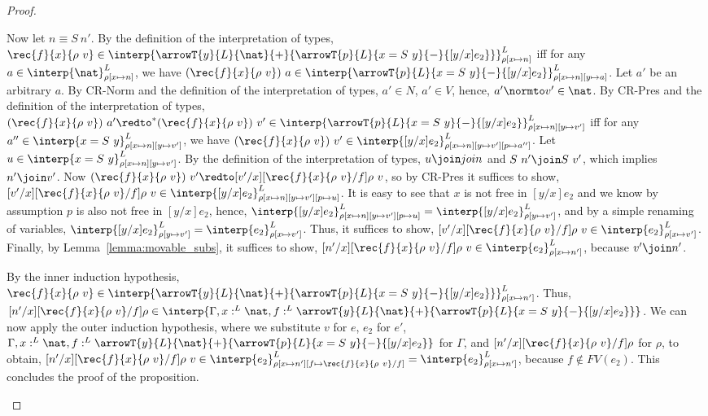 \begin{proof}
\begin{itemize}
  \noindent
  Now let $n \equiv S\ n'$.  By the definition of the interpretation
  of types, $\rec{f}{x}{\rho\ v} \in
  \interp{\arrowT{y}{L}{\nat}{+}{\arrowT{p}{L}{x =
  S\ y}{-}{[y/x]e_2}}}^L_{\rho[x \mapsto n]}$ iff for any $a
  \in \interp{\nat}^L_{\rho[x \mapsto n]}$, we have
  $(\rec{f}{x}{\rho\ v})\ a \in \interp{\arrowT{p}{L}{x =
  S\ y}{-}{[y/x]e_2}}^L_{\rho[x \mapsto n][y \mapsto a]}$.  Let
  $a'$ be an arbitrary $a$. By CR-Norm and the definition of the
  interpretation of types, $a' \in N$, $a' \in V$, hence, $a' \normto
  v' \in \nat$.  By CR-Pres and the definition of the interpretation of
  types, $(\rec{f}{x}{\rho\ v})\ a' \redto^*
  (\rec{f}{x}{\rho\ v})\ v' \in \interp{\arrowT{p}{L}{x =
  S\ y}{-}{[y/x]e_2}}^L_{\rho[x \mapsto n][y \mapsto v']}$ iff
  for any $a'' \in \interp{x = S\ y}^L_{\rho[x \mapsto n][y \mapsto
  v']}$, we have $(\rec{f}{x}{\rho\ v})\ v' \in
  \interp{[y/x]e_2}^L_{\rho[x \mapsto n][y \mapsto v'][p \mapsto 
  a'']}$.  Let 
  $u \in \interp{x = S\ y}^L_{\rho[x \mapsto n][y \mapsto v']}$.  By the definition of the
  interpretation of types, $u \join join$ and $S\ n' \join S\ v'$,
  which implies $n' \join v'$.  Now $(\rec{f}{x}{\rho\ v})\ v'
  \redto [v'/x][\rec{f}{x}{\rho\ v}/f]\rho\ v$, so by CR-Pres it
  suffices to show, $[v'/x][\rec{f}{x}{\rho\ v}/f]\rho\ v \in
  \interp{[y/x]e_2}^L_{\rho[x \mapsto n][y \mapsto v'][p \mapsto
  u]}$.  It is easy to see that $x$ is not free in $[y/x]e_2$ and
  we know by assumption $p$ is also not free in $[y/x]e_2$, hence, 
  $\interp{[y/x]e_2}^L_{\rho[x \mapsto n][y \mapsto v'][p \mapsto u]} = 
  \interp{[y/x]e_2}^L_{\rho[y \mapsto v']}$, and by a simple renaming of variables,
  $\interp{[y/x]e_2}^L_{\rho[y \mapsto v']} =
  \interp{e_2}^L_{\rho[x \mapsto v']}$.  Thus, it suffices to show,
  $[v'/x][\rec{f}{x}{\rho\ v}/f]\rho\ v \in
  \interp{e_2}^L_{\rho[x \mapsto v']}$.  Finally, by 
  Lemma~\ref{lemma:movable_subs},
  it suffices to show, $[n'/x][\rec{f}{x}{\rho\ v}/f]\rho\ v \in
  \interp{e_2}^L_{\rho[x \mapsto n']}$, because $v' \join n'$.

  \noindent
  By the inner induction hypothesis, $\rec{f}{x}{\rho\ v} \in
  \interp{\arrowT{y}{L}{\nat}{+}{\arrowT{p}{L}{x =
  S\ y}{-}{[y/x]e_2}}}^L_{\rho[x \mapsto n']}$.
  Thus, $[n'/x][\rec{f}{x}{\rho\ v}/f]\rho \in
  \interp{\Gamma,x:^L \nat, f:^L
  \arrowT{y}{L}{\nat}{+}{\arrowT{p}{L}{x = S\ y}{-}{[y/x]e_2}}}$.
  We can now apply the outer induction hypothesis, where we substitute
  $v$ for $e$, $e_2$ for $e'$, $\Gamma,x:^L \nat,f:^L
  \arrowT{y}{L}{\nat}{+}{\arrowT{p}{L}{x = S\ y}{-}{[y/x]e_2}}$ for
  $\Gamma$, and $[n'/x][\rec{f}{x}{\rho\ v}/f]\rho$ for $\rho$,
  to obtain, $[n'/x][\rec{f}{x}{\rho\ v}/f]\rho\ v \in
  \interp{e_2}^L_{\rho[x \mapsto n'][f \mapsto
  \rec{f}{x}{\rho\ v}/f]} = \interp{e_2}^L_{\rho[x \mapsto
  n']}$, because $f \not \in FV(e_2)$.  This concludes the proof of the proposition.


\end{itemize}
\end{proof}
